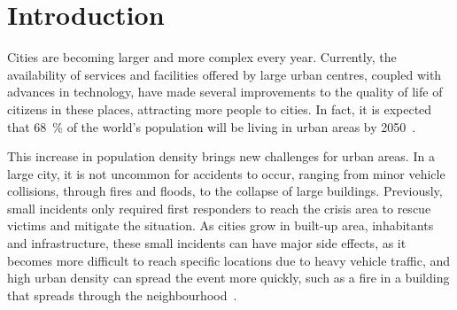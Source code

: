 \chapter{Introduction}\label{cap:introducao}

\begin{refsection}


Cities are becoming larger and more complex every year. Currently, the availability of services and facilities offered by large urban centres, coupled with advances in technology, have made several improvements to the quality of life of citizens in these places, attracting more people to cities. In fact, it is expected that 68~\% of the world's population will be living in urban areas by 2050~\cite{de_Amorim_2019}.


This increase in population density brings new challenges for urban areas. In a large city, it is not uncommon for accidents to occur, ranging from minor vehicle collisions, through fires and floods, to the collapse of large buildings. Previously, small incidents only required first responders to reach the crisis area to rescue victims and mitigate the situation. As cities grow in built-up area, inhabitants and infrastructure, these small incidents can have major side effects, as it becomes more difficult to reach specific locations due to heavy vehicle traffic, and high urban density can spread the event more quickly, such as a fire in a building that spreads through the neighbourhood~\cite{Ghosh201713}.


\end{refsection}
